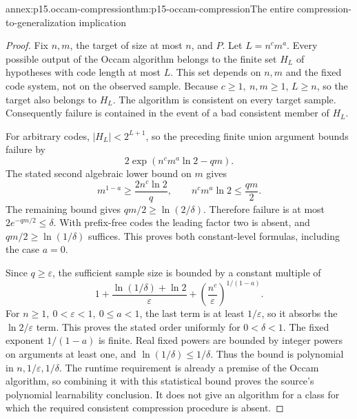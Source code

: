 \begin{annexitem}{annex:p15.occam-compression}{thm:p15-occam-compression}{The entire compression-to-generalization implication}
\begin{proof}
Fix \(n,m\), the target of size at most \(n\), and \(P\).
Let \(L=n^c m^a\). Every possible output of the Occam
algorithm belongs to the finite set \(H_L\) of hypotheses
with code length at most \(L\). This set depends on
\(n,m\) and the fixed code system, not on the observed
sample. Because \(c\geq1,\ n,m\geq1\), \(L\geq n\),
so the target also belongs to \(H_L\).
The algorithm is consistent on every target sample.
Consequently failure is contained in the event of a
bad consistent member of \(H_L\).

For arbitrary codes, \(|H_L|<2^{L+1}\), so the preceding
finite union argument bounds failure by
\[
                2\exp(n^c m^a\ln2-qm).
\]
The stated second algebraic lower bound on \(m\) gives
\[
 m^{1-a}\geq\frac{2n^c\ln2}{q},
 \qquad n^c m^a\ln2\leq\frac{qm}{2}.
\]
The remaining bound gives
\(qm/2\geq\ln(2/\delta)\). Therefore failure is at most
\(2e^{-qm/2}\leq\delta\).
With prefix-free codes the leading factor two is absent,
and \(qm/2\geq\ln(1/\delta)\) suffices.
This proves both constant-level formulas, including
the case \(a=0\).

Since \(q\geq\varepsilon\), the sufficient sample size
is bounded by a constant multiple of
\[
 1+\frac{\ln(1/\delta)+\ln2}{\varepsilon}
       +\left(\frac{n^c}{\varepsilon}\right)^{1/(1-a)}.
\]
For \(n\geq1,\ 0<\varepsilon<1,\ 0\leq a<1\), the last
term is at least \(1/\varepsilon\), so it absorbs
the \(\ln2/\varepsilon\) term. This proves the stated
order uniformly for \(0<\delta<1\).
The fixed exponent \(1/(1-a)\) is finite.
Real fixed powers are bounded by integer powers on
arguments at least one, and \(\ln(1/\delta)\leq1/\delta\).
Thus the bound is polynomial in \(n,1/\varepsilon,1/\delta\).
The runtime requirement is already a premise of the
Occam algorithm, so combining it with this statistical
bound proves the source's polynomial learnability conclusion.
It does not give an algorithm for a class for which
the required consistent compression procedure is absent.
\end{proof}
\end{annexitem}

